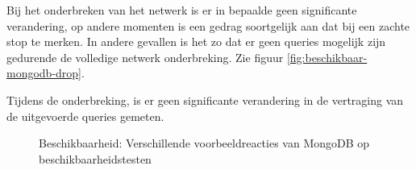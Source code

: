 Bij het onderbreken van het netwerk is er in bepaalde geen significante verandering, op andere momenten is een gedrag soortgelijk aan dat bij een zachte stop te merken. In andere gevallen is het zo dat er geen queries mogelijk zijn gedurende de volledige netwerk onderbreking. Zie figuur \ref{fig:beschikbaar-mongodb-drop}. 

Tijdens de onderbreking, is er geen significante verandering in de vertraging van de uitgevoerde queries gemeten. 
 
\begin{figure}[ht!] 
	\centering
	\caption{Beschikbaarheid: Verschillende voorbeeldreacties van MongoDB op beschikbaarheidstesten }
	\label{fig:beschikbaar-mongodb-1}
\end{figure}

